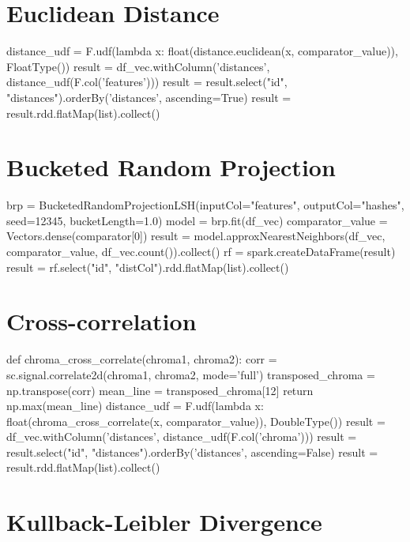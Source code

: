 \section{Euclidean Distance}

\begin{pythonCode}
distance_udf = F.udf(lambda x: float(distance.euclidean(x, comparator_value)), FloatType())
result = df_vec.withColumn('distances', distance_udf(F.col('features')))
result = result.select("id", "distances").orderBy('distances', ascending=True)
result = result.rdd.flatMap(list).collect()
\end{pythonCode}

\section{Bucketed Random Projection}

\begin{pythonCode}
brp = BucketedRandomProjectionLSH(inputCol="features", outputCol="hashes", seed=12345, bucketLength=1.0)
model = brp.fit(df_vec)
comparator_value = Vectors.dense(comparator[0])
result = model.approxNearestNeighbors(df_vec, comparator_value, df_vec.count()).collect()
rf = spark.createDataFrame(result)
result = rf.select("id", "distCol").rdd.flatMap(list).collect()
\end{pythonCode}


\section{Cross-correlation}

\begin{pythonCode}
def chroma_cross_correlate(chroma1, chroma2):
    corr = sc.signal.correlate2d(chroma1, chroma2, mode='full') 
    transposed_chroma = np.transpose(corr)
    mean_line = transposed_chroma[12]
    return np.max(mean_line)
distance_udf = F.udf(lambda x: float(chroma_cross_correlate(x, comparator_value)), DoubleType())
result = df_vec.withColumn('distances', distance_udf(F.col('chroma')))
result = result.select("id", "distances").orderBy('distances', ascending=False)
result = result.rdd.flatMap(list).collect()
\end{pythonCode}


\section{Kullback-Leibler Divergence}

